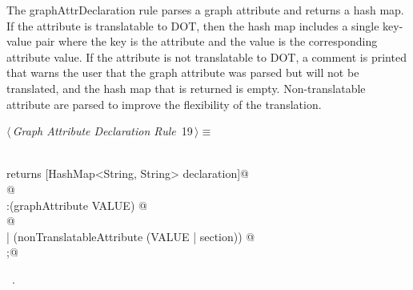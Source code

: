 \documentclass[a4paper]{report}
\begin{document}
The graphAttrDeclaration rule parses a graph attribute and returns a hash map. If the attribute is translatable to DOT, then the hash map includes a single key-value pair where the key is the attribute and the value is the corresponding attribute value. If the attribute is not translatable to DOT, a comment is printed that warns the user that the graph attribute was parsed but will not be translated, and the hash map that is returned is empty. Non-translatable attribute are parsed to improve the flexibility of the translation. 
\begin{flushleft} \small
\begin{minipage}{\linewidth}\label{scrap19}\raggedright\small
{} $\langle\,${\itshape Graph Attribute Declaration Rule}\nobreak\ {\footnotesize {19}}$\,\rangle\equiv$
\vspace{-1ex}
\begin{list}{}{} \item
\mbox{}\verb@@\\
\mbox{}\verb@graphAttrDeclaration returns [HashMap<String, String> declaration]@\\
\mbox{}@\\
\mbox{}\verb@:(graphAttribute VALUE) @\\
\mbox{}@\\
\mbox{}\verb@| (nonTranslatableAttribute (VALUE | section)) @\\
\mbox{};@\\
\mbox{}\verb@@{\NWsep}
\end{list}
\vspace{-1.5ex}
\footnotesize
\begin{list}{}{\setlength{\itemsep}{-\parsep}\setlength{\itemindent}{-\leftmargin}}
\item \NWtxtMacroRefIn\ .

\item{}
\end{list}
\end{minipage}\vspace{4ex}
\end{flushleft}
\end{document}
